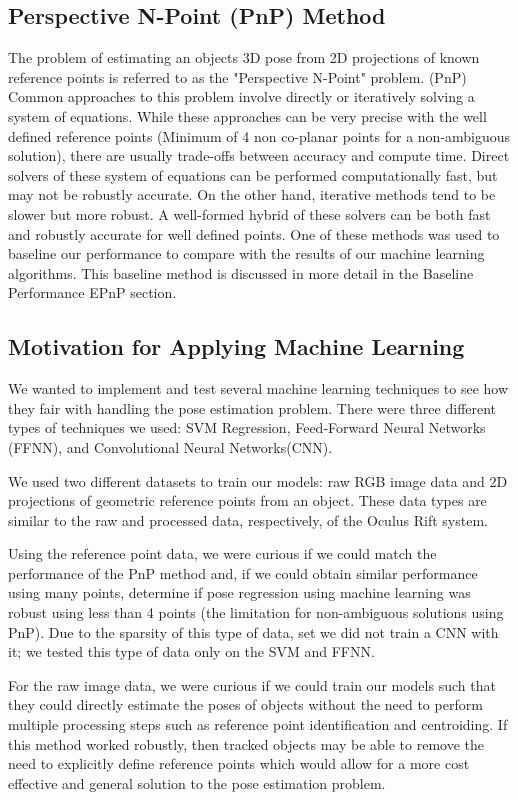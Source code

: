 \documentclass[journal]{IEEEtran}
\begin{document}
\subsection{Perspective N-Point (PnP) Method}
The problem of estimating an objects 3D pose from 2D projections of known reference points is referred to as the "Perspective N-Point" problem. (PnP) 
Common approaches to this problem involve directly or iteratively solving a system of equations\cite{EPnP}. While these approaches can be very precise with the well defined reference points (Minimum of 4 non co-planar points for a non-ambiguous solution), there are usually trade-offs between accuracy and compute time. Direct solvers of these system of equations can be performed computationally fast, but may not be robustly accurate. On the other hand, iterative methods tend to be slower but more robust. A well-formed hybrid of these solvers can be both fast and robustly accurate for well defined points. One of these methods was used to baseline our performance to compare with the results of our machine learning algorithms. This baseline method is discussed in more detail in the Baseline Performance EPnP section.



\subsection{Motivation for Applying Machine Learning}
We wanted to implement and test several machine learning techniques to see how they fair with handling the pose estimation problem. There were three different types of techniques we used: SVM Regression, Feed-Forward Neural Networks (FFNN), and Convolutional Neural Networks(CNN). 

We used two different datasets to train our models: raw RGB image data and 2D projections of geometric reference points from an object.
These data types are similar to the raw and processed data, respectively, of the Oculus Rift system. 

Using the reference point data, we were curious if we could match the performance of the PnP method and, if we could obtain similar performance using many points, determine if pose regression using machine learning was robust using less than 4 points (the limitation for non-ambiguous solutions using PnP). Due to the sparsity of this type of data, set we did not train a CNN with it; we tested this type of data only on the SVM and FFNN. 

For the raw image data, we were curious if we could train our models such that they could directly estimate the poses of objects without the need to perform multiple processing steps such as reference point identification and centroiding. If this method worked robustly, then tracked objects may be able to remove the need to explicitly define reference points which would allow for a more cost effective and general solution to the pose estimation problem. 
 
\end{document}
